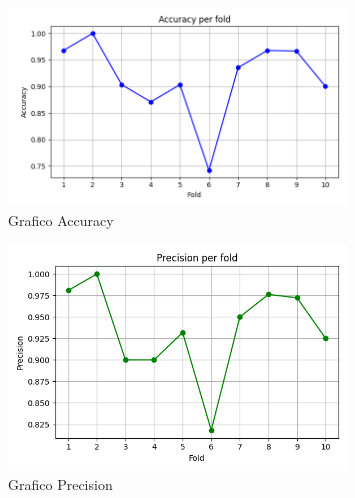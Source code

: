 \documentclass[a4paper,12pt]{report}
\begin{document}
\vspace*{\fill}
\begin{figure}[h]
\centering
\includegraphics[width=0.8\textwidth]{accuracy.png}
\caption{Grafico Accuracy}
\end{figure}
\hfill \break
\begin{figure}[h]
\centering
\includegraphics[width=0.8\textwidth]{precision.png}
\caption{Grafico Precision}
\end{figure}
\vspace*{\fill}
\newpage
\end{document}
